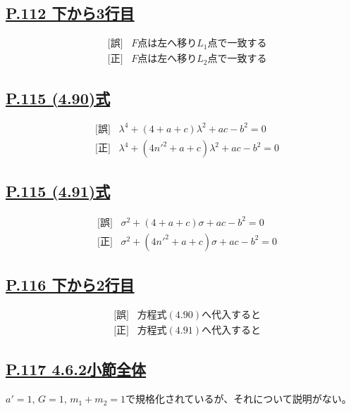 \documentclass[9pt,fleqn]{bxjsarticle}
\begin{document}
\subsection*{\underline{P.112 下から3行目}}
\begin{align*}
    &\text{[誤]} \hspace{10pt} F\text{点は左へ移り}L_1\text{点で一致する} \\
    &\text{[正]} \hspace{10pt} F\text{点は左へ移り}L_2\text{点で一致する}
\end{align*}

\subsection*{\underline{P.115 (4.90)式}}
\begin{align*}
    &\text{[誤]} \hspace{10pt} \lambda^4 + \left(4+a+c\right)\lambda^2 + ac - b^2 = 0 \\
    &\text{[正]} \hspace{10pt} \lambda^4 + \left(4n'^2+a+c\right)\lambda^2 + ac - b^2 = 0 
\end{align*}

\subsection*{\underline{P.115 (4.91)式}}
\begin{align*}
    &\text{[誤]} \hspace{10pt} \sigma^2 + \left(4+a+c\right)\sigma + ac - b^2 = 0 \\
    &\text{[正]} \hspace{10pt} \sigma^2 + \left(4n'^2+a+c\right)\sigma + ac - b^2 = 0 
\end{align*}

\subsection*{\underline{P.116 下から2行目}}
\begin{align*}
    &\text{[誤]} \hspace{10pt} \text{方程式}(4.90)\text{へ代入すると} \\
    &\text{[正]} \hspace{10pt} \text{方程式}(4.91)\text{へ代入すると} 
\end{align*}

\subsection*{\underline{P.117 4.6.2小節全体}}
$a'=1,\,G=1,\,m_1+m_2=1$で規格化されているが、それについて説明がない。
\end{document}
